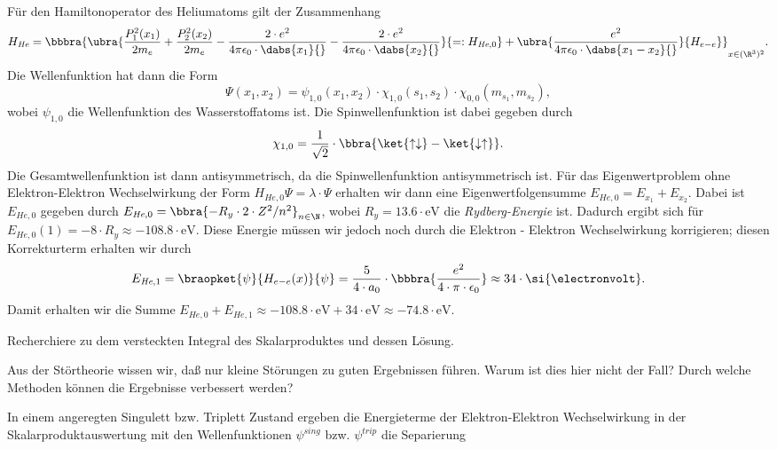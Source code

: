 \documentclass{subfiles}
\begin{document}
        Für den Hamiltonoperator des Heliumatoms gilt der Zusammenhang
        \[
            H_\textit{He} = \bbbra{\ubra{\frac{P_1^2(x_1)}{2m_e} + \frac{P_2^2(x_2)}{2m_e} - \frac{2\cdot e^2}{4\pi\epsilon_0\cdot\dabs{x_1}{}} - \frac{2\cdot e^2}{4\pi\epsilon_0\cdot\dabs{x_2}{}}}{=:H_{\textit{He},0}} + \ubra{\frac{e^2}{4\pi\epsilon_0\cdot\dabs{x_1-x_2}{}}}{H_{e-e}}}_{x\in(\R^3)^2}.
        \]
        Die Wellenfunktion hat dann die Form 
        \[
            \Psi(x_1,x_2) = \psi_{1,0}(x_1,x_2)\cdot\chi_{1,0}(s_1,s_2)\cdot\chi_{0,0}(m_{s_1},m_{s_2}),
        \]
        wobei $\psi_{1,0}$ die Wellenfunktion des Wasserstoffatoms ist. Die Spinwellenfunktion ist dabei gegeben durch
        \[
            \chi_{1,0} = \frac{1}{\sqrt{2}}\cdot\bbra{\ket{\uparrow\downarrow} - \ket{\downarrow\uparrow}}.
        \]
        Die Gesamtwellenfunktion ist dann antisymmetrisch, da die Spinwellenfunktion antisymmetrisch ist. Für das Eigenwertproblem ohne Elektron-Elektron Wechselwirkung der Form $H_{\textit{He},0}\Psi = \lambda\cdot\Psi$ erhalten wir dann eine Eigenwertfolgensumme $E_{\textit{He},0} = E_{x_1} + E_{x_2}$. Dabei ist $E_{\textit{He},0}$ gegeben durch $E_{\textit{He},0} = \bbra{-R_y\cdot 2\cdot Z^2/n^2}_{n\in\N}$, wobei $R_y = 13.6\cdot\text{eV}$ die \emph{Rydberg-Energie} ist. Dadurch ergibt sich für $E_{\textit{He},0}(1) = -8\cdot R_y \approx -108.8\cdot\si{\electronvolt}$. Diese Energie müssen wir jedoch noch durch die Elektron - Elektron Wechselwirkung korrigieren; diesen Korrekturterm erhalten wir durch
        \[
            E_{\textit{He},1} = \braopket{\psi}{H_{e-e}(x)}{\psi} = \frac{5}{4\cdot a_0}\cdot\bbbra{\frac{e^2}{4\cdot\pi\cdot\epsilon_0}} \approx 34\cdot\si{\electronvolt}.
        \]
        Damit erhalten wir die Summe $E_{\textit{He},0} + E_{\textit{He},1} \approx -108.8\cdot\si{\electronvolt} + 34\cdot\si{\electronvolt} \approx -74.8\cdot\si{\electronvolt}$.
        \begin{Aufgabe}
            \nr{} Recherchiere zu dem versteckten Integral des Skalarproduktes und dessen Lösung. 

            \nr{} Aus der Störtheorie wissen wir, daß nur kleine Störungen zu guten Ergebnissen führen. Warum ist dies hier nicht der Fall? Durch welche Methoden können die Ergebnisse verbessert werden?
        \end{Aufgabe}
        In einem angeregten Singulett bzw. Triplett Zustand ergeben die Energieterme der Elektron-Elektron Wechselwirkung in der Skalarproduktauswertung mit den Wellenfunktionen $\psi^\textit{sing}$ bzw. $\psi^\textit{trip}$ die Separierung
\end{document}
